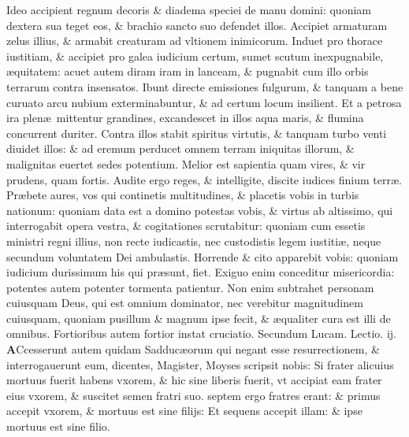 \documentclass[a5paper,10pt]{book}
\def\leftmarginnote{%
	\lrmarginnote{\hskip -\marginparsep \hskip -6.5em}}
\def\rightmarginnote{%
	\lrmarginnote{\hskip\columnwidth \hskip -1em}}
\def\ae{æ}
\begin{document}
\begin{multicols*}{2}
Ideo accipient regnum decoris \& diadema speciei de manu domini: quoniam dextera sua teget eos, \& brachio sancto suo defendet illos.
Accipiet armaturam zelus illius, \& armabit creaturam ad vltionem inimicorum. Induet pro thorace iustitiam, \& accipiet pro galea iudicium certum, sumet scutum inexpugnabile, \ae quitatem: acuet autem diram iram in lanceam, \& pugnabit
cum illo orbis terrarum contra insensatos.
Ibunt directe emissiones fulgurum, \& tanquam a bene curuato arcu nubium exterminabuntur, \& ad certum locum insilient.
Et a petrosa ira plen\ae \ mittentur grandines, excandescet in illos aqua maris, \& flumina concurrent duriter.
Contra illos stabit spiritus virtutis, \& tanquam turbo venti diuidet illos: \& ad eremum perducet omnem terram iniquitas illorum, \& malignitas euertet sedes potentium.
\newline \indent Melior\leftmarginnote{\begin{flushright}ca. 6.\end{flushright}} est sapientia quam vires, \& vir prudens, quam fortis.
Audite ergo reges, \& intelligite, discite iudices finium terr\ae . Pr\ae bete aures, vos qui continetis multitudines, \& placetis vobis in turbis nationum: quoniam data est a domino potestas vobis, \& virtus ab altissimo, qui interrogabit opera vestra, \& cogitationes scrutabitur: quoniam cum essetis ministri regni illius, non recte iudicastis, nec custodistis legem iustiti\ae , neque secundum voluntatem Dei ambulastis.
Horrende \& cito apparebit vobis: quoniam iudicium durissimum his qui pr\ae sunt, fiet. Exiguo enim conceditur misericordia: potentes autem potenter tormenta patientur.
Non enim subtrahet personam cuiusquam Deus, qui est omnium dominator, nec verebitur magnitudinem cuiusquam, quoniam pusillum \& magnum ipse fecit, \& \ae qualiter cura est illi de omnibus.
Fortioribus autem fortior instat cruciatio.
\fancyhead[C]{\color{red} Feria. v. Dominic\ae . iij. post aduentum}
\newline \color{red} Secundum Lucam. \hfill Lectio. ij. \color{black}
\vspace{-.25em}
\lettrine[lines=2]{\bfseries \color{red} A}{}Ccesserunt\rightmarginnote{c. 20.} autem quidam Sadduc\ae orum qui negant esse resurrectionem, \& interrogauerunt eum, dicentes, Magister, Moyses scripsit nobis: Si frater alicuius mortuus fuerit habens vxorem, \& hic sine liberis fuerit, vt accipiat eam frater eius vxorem, \& suscitet semen fratri suo. septem ergo fratres erant: \& primus accepit vxorem, \& mortuus est sine filijs: Et sequens accepit illam: \& ipse mortuus est sine filio.

\end{multicols*}
\end{document}
